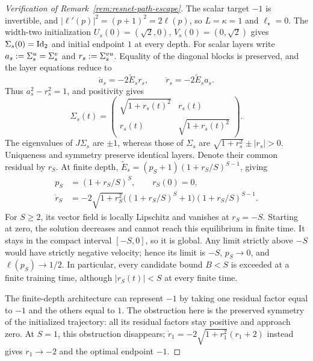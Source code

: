 \begin{proof}[Verification of Remark~\ref{rem:resnet-path-escape}]
The scalar target $-1$ is invertible, and
$|\ell'(p)|^2=(p+1)^2=2\ell(p)$, so $L=\kappa=1$ and
$\ell_\star=0$. The width-two initialization
$U_s(0)=(\sqrt2,0)$, $V_s(0)=(0,\sqrt2)$ gives
$\Sigma_s(0)=\mathrm{Id}_2$ and initial endpoint $1$ at every depth.
For scalar layers write $a_s:=\Sigma^u_s=\Sigma^v_s$ and
$r_s:=\Sigma^{vu}_s$. Equality of the diagonal blocks is preserved, and the
layer equations reduce to
\[
 \dot a_s=-2\widetilde E_s r_s,\qquad
 \dot r_s=-2\widetilde E_s a_s.
\]
Thus $a_s^2-r_s^2=1$, and positivity gives
\[
 \Sigma_s(t)=\begin{pmatrix}
  \sqrt{1+r_s(t)^2}&r_s(t)\\
  r_s(t)&\sqrt{1+r_s(t)^2}
 \end{pmatrix}.
\]
The eigenvalues of $J\Sigma_s$ are $\pm1$, whereas those of
$\Sigma_s$ are $\sqrt{1+r_s^2}\pm|r_s|>0$.
Uniqueness and symmetry preserve identical layers. Denote their common
residual by $r_S$. At finite depth,
$\widetilde E_s=(p_S+1)(1+r_S/S)^{S-1}$, giving
\begin{equation}\label{eq:resnet-escape-finite}
 \begin{aligned}
 p_S&=(1+r_S/S)^S,\qquad r_S(0)=0,\\
 \dot r_S&=-2\sqrt{1+r_S^2}\big((1+r_S/S)^S+1\big)(1+r_S/S)^{S-1}.
 \end{aligned}
\end{equation}
For $S\ge2$, its vector field is locally Lipschitz and vanishes at $r_S=-S$.
Starting at zero, the solution decreases and cannot reach this equilibrium
in finite time. It stays in the compact interval $[-S,0]$, so it is global.
Any limit strictly above $-S$ would have strictly negative velocity;
hence its limit is $-S$, $p_S\to0$, and $\ell(p_S)\to1/2$.
In particular, every candidate bound $B<S$ is exceeded at a finite
training time, although $|r_S(t)|<S$ at every finite time.

The finite-depth architecture can represent $-1$ by taking one residual
factor equal to $-1$ and the others equal to $1$. The obstruction here
is the preserved symmetry of the initialized trajectory: all its
residual factors stay positive and approach zero. At $S=1$, this
obstruction disappears; $\dot r_1=-2\sqrt{1+r_1^2}(r_1+2)$ instead
gives $r_1\to-2$ and the optimal endpoint $-1$.


\end{proof}

